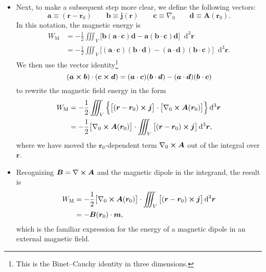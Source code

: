 \documentclass[11pt, a4paper]{article}
\newcommand{\diff}{\mathop{}\!\mathrm{d}} %
\newcommand{\dr}{\diff^{3} \r}  %
\renewcommand{\vec}[1]{\bm{#1}} %
\renewcommand{\r}{\vec{r}}
\newcommand{\B}{\vec{B}} %
\newcommand{\A}{\vec{A}} %
\newcommand{\m}{\vec{m}}  %
\renewcommand{\j}{\vec{j}}  %
\renewcommand{\curl}{\nabla \cross}
\renewcommand{\grad}{\nabla}
\begin{document}
\begin{itemize}
    \item Next, to make a subsequent step more clear, we define the following vectors:
	\begin{equation*}
		\vec{a} \equiv (\r - \r_{0}) \qquad \vec{b} \equiv \j(\r) \qquad \vec{c} \equiv \grad_{0} \qquad \vec{d} \equiv \A(\r_{0}).
	\end{equation*}
	In this notation, the magnetic energy is
	\begin{align*}
		W_{\text{M}} &= -\frac{1}{2}\iiint_{V}\Big[\vec{b}   (\vec{a} \cdot \vec{c}) \vec{d} - \vec{a}(\vec{b}\cdot \vec{c})\vec{d} \Big] \dr\\
		& = -\frac{1}{2}\iiint_{V}\Big[(\vec{a} \cdot \vec{c}) (\vec{b}\cdot\vec{d}) - (\vec{a} \cdot \vec{d}) (\vec{b}\cdot \vec{c}) \Big] \dr.
	\end{align*}
	We then use the vector identity\footnote{This is the Binet–Cauchy identity in three dimensions.}
	\begin{equation*}
		(\vec{a}\cross \vec{b}) \cdot (\vec{c} \cross \vec{d}) = 	(\vec{a}\cdot \vec{c}) (\vec{b} \cdot \vec{d}) - 	(\vec{a}\cdot \vec{d}) (\vec{b} \cdot \vec{c})
	\end{equation*}
	to rewrite the magnetic field energy in the form
	\begin{align*}
		W_{\text{M}} &= - \frac{1}{2}\iiint_{V} \Big\{\big[(\r - \r_{0}) \cross \j\big] \cdot \big[\grad_{0}\cross \A(\r_{0})\big] \Big\}\dr\\
		& = -\frac{1}{2} \big[\grad_{0}\cross \A(\r_{0})\big] \cdot \iiint_{V}\big[(\r - \r_{0}) \cross \j\big] \dr,
	\end{align*}
	where we have moved the $ \r_{0} $-dependent term $ \grad_{0} \cross \A $ out of the integral over $ \r $. 
	
	\item Recognizing $ \B = \curl \A $ and the magnetic dipole in the integrand, the result is
	\begin{align*}
		W_{\text{M}} &=  -\frac{1}{2} \big[\grad_{0}\cross \A(\r_{0})\big] \cdot \iiint_{V}\big[(\r - \r_{0}) \cross \j\big] \dr\\
		&= - \B(\r_{0})  \cdot \m,
	\end{align*}
	which is the familiar expression for the energy of a magnetic dipole in an external magnetic field.
	
\end{itemize}
\end{document}
